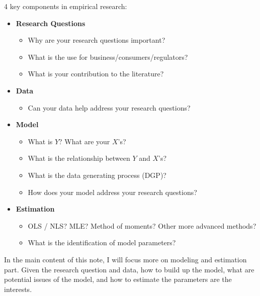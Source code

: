 \documentclass[12pt, a4paper]{article}
\begin{document}
4 key components in empirical research:

\begin{itemize}
    \item \textbf{Research Questions}
    \begin{itemize}
        \item Why are your research questions important?
        \item What is the use for business/consumers/regulators?
        \item What is your contribution to the literature?
    \end{itemize}
    
    \item \textbf{Data}
    \begin{itemize}
        \item Can your data help address your research questions?
    \end{itemize}
    
    \item \textbf{Model}
    \begin{itemize}
        \item What is \(Y\)? What are your \(X\)'s?
        \item What is the relationship between \(Y\) and \(X\)'s?
        \item What is the data generating process (DGP)?
        \item How does your model address your research questions?
    \end{itemize}
    
    \item \textbf{Estimation}
    \begin{itemize}
        \item OLS / NLS? MLE? Method of moments? Other more advanced methods?
        \item What is the identification of model parameters?
    \end{itemize}
\end{itemize}

In the main content of this note, I will focus more on modeling and estimation part. 
Given the research question and data, how to build up the model, what are potential issues of the model, and how to estimate the parameters are the interests.
\end{document}
